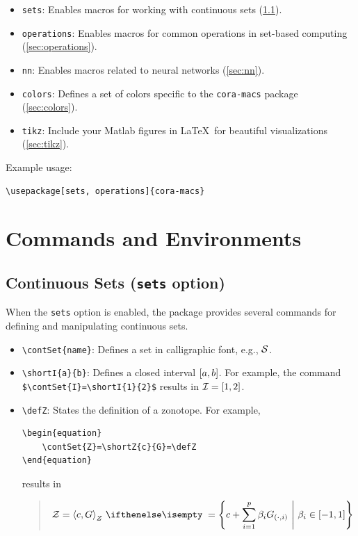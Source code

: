 \documentclass{article}
\begin{document}
\begin{itemize}
  \item \texttt{sets}: Enables macros for working with continuous sets (\cref{sec:sets}).
  \item \texttt{operations}: Enables macros for common operations in set-based computing (\cref{sec:operations}).
  \item \texttt{nn}: Enables macros related to neural networks (\cref{sec:nn}).
  \item \texttt{colors}: Defines a set of colors specific to the \texttt{cora-macs} package (\cref{sec:colors}).
  \item \texttt{tikz}: Include your Matlab figures in \LaTeX\ for beautiful visualizations (\cref{sec:tikz}).
\end{itemize}

\noindent
Example usage:
\begin{verbatim}
\usepackage[sets, operations]{cora-macs}
\end{verbatim}


\section{Commands and Environments}

\subsection{Continuous Sets (\texttt{sets} option)} \label{sec:sets}
When the \texttt{sets} option is enabled, the package provides several commands for defining and manipulating continuous sets.

\begin{itemize}
  \item \verb|\contSet{name}|: Defines a set in calligraphic font, e.g., $\mathcal{S}$.
  \item \verb|\shortI{a}{b}|: Defines a closed interval $\left[a,b\right]$. For example, the command \verb|$\contSet{I}=\shortI{1}{2}$| results in $\mathcal{I}=\left[1,2\right]$.
  \item \verb|\defZ|: States the definition of a zonotope. For example,
        \begin{verbatim}
\begin{equation}
    \contSet{Z}=\shortZ{c}{G}=\defZ
\end{equation}
\end{verbatim}
        \vspace{-2\baselineskip}
        results in
        \begin{quote}
          \begin{equation}
            \contSet{Z}=\shortZ{c}{G}=\defZ
          \end{equation}
        \end{quote}
\end{itemize}
\end{document}
